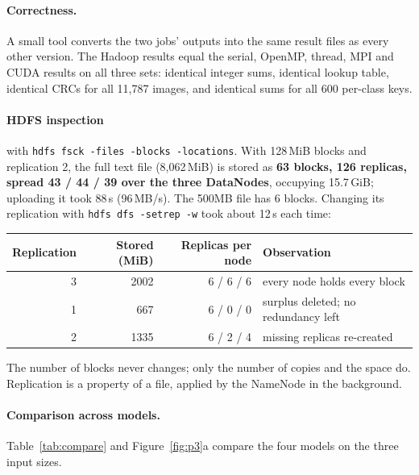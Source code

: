 \documentclass{zc-ust-hw}
\begin{document}
\paragraph{Correctness.} A small tool converts the two jobs' outputs into the same result files
as every other version. The Hadoop results equal the serial, OpenMP, thread, MPI and CUDA
results on all three sets: identical integer sums, identical lookup table, identical CRCs for
all 11{,}787 images, and identical sums for all 600 per-class keys.

\paragraph{HDFS inspection} with \texttt{hdfs fsck -files -blocks -locations}. With 128\,MiB
blocks and replication 2, the full text file (8{,}062\,MiB) is stored as
\textbf{63 blocks, 126 replicas, spread 43 / 44 / 39 over the three DataNodes}, occupying
15.7\,GiB; uploading it took 88\,s (96\,MB/s). The 500MB file has 6 blocks. Changing its
replication with \texttt{hdfs dfs -setrep -w} took about 12\,s each time:
\begin{center}\small
\begin{tabular}{rrrl}
\toprule
Replication & Stored (MiB) & Replicas per node & Observation \\
\midrule
3 & 2002 & 6 / 6 / 6 & every node holds every block \\
1 & 667 & 6 / 0 / 0 & surplus deleted; no redundancy left \\
2 & 1335 & 6 / 2 / 4 & missing replicas re-created \\
\bottomrule
\end{tabular}
\end{center}
The number of blocks never changes; only the number of copies and the space do. Replication is
a property of a file, applied by the NameNode in the background.

\paragraph{Comparison across models.} Table~\ref{tab:compare} and Figure~\ref{fig:p3}a compare the
four models on the three input sizes.
\end{document}

